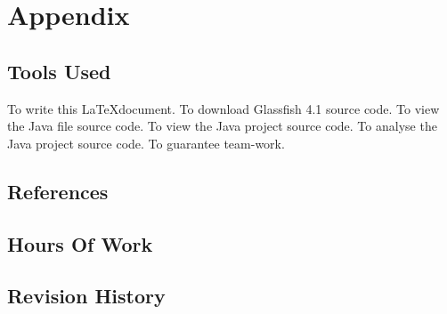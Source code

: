 \section{Appendix}

\subsection{Tools Used}
\begin{enumerate}
	 To write this \LaTeX document.
	 To download Glassfish 4.1 source code.
	 To view the Java file source code.
	 To view the Java project source code.
	 To analyse the Java project source code.
	 To guarantee team-work.
\end{enumerate}

\subsection{References}

\subsection{Hours Of Work}

\subsection{Revision History}
